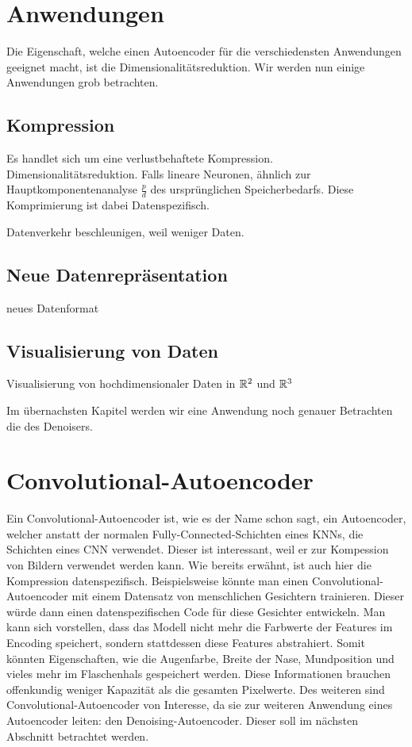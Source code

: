 \section{Anwendungen}
Die Eigenschaft, welche einen Autoencoder für die verschiedensten
Anwendungen geeignet macht, ist die Dimensionalitätsreduktion.
Wir werden nun einige Anwendungen grob betrachten.

\subsection{Kompression}
Es handlet sich um eine verlustbehaftete Kompression.
Dimensionalitätsreduktion. Falls lineare Neuronen, ähnlich zur Hauptkomponentenanalyse
$\frac{p}{d}$ des ursprünglichen Speicherbedarfs. Diese Komprimierung ist dabei Datenspezifisch.

Datenverkehr beschleunigen, weil weniger Daten.

\subsection{Neue Datenrepräsentation}
neues Datenformat

\subsection{Visualisierung von Daten}
Visualisierung von hochdimensionaler Daten in $\mathbb{R}^2$ und $\mathbb{R}^3$


Im übernachsten Kapitel werden wir eine Anwendung noch genauer Betrachten die
des Denoisers.

\section{Convolutional-Autoencoder}
Ein Convolutional-Autoencoder ist, wie es der Name schon sagt, ein Autoencoder,
welcher anstatt der normalen Fully-Connected-Schichten eines KNNs, die Schichten eines CNN verwendet.
Dieser ist interessant, weil er zur Kompession von Bildern verwendet werden kann.
Wie bereits erwähnt, ist auch hier die Kompression datenspezifisch.
Beispielsweise könnte man einen Convolutional-Autoencoder mit einem Datensatz
von menschlichen Gesichtern trainieren. Dieser würde dann einen
datenspezifischen Code für diese Gesichter entwickeln. Man kann sich
vorstellen, dass das Modell nicht mehr die Farbwerte der Features im Encoding
speichert, sondern stattdessen diese Features abstrahiert. Somit könnten
Eigenschaften, wie die Augenfarbe, Breite der Nase, Mundposition und vieles mehr
im Flaschenhals gespeichert werden. Diese Informationen brauchen offenkundig
weniger Kapazität als die gesamten Pixelwerte.
\para{}
Des weiteren sind Convolutional-Autoencoder von Interesse, da sie zur weiteren
Anwendung eines Autoencoder leiten: den Denoising-Autoencoder.
Dieser soll im nächsten Abschnitt betrachtet werden.

